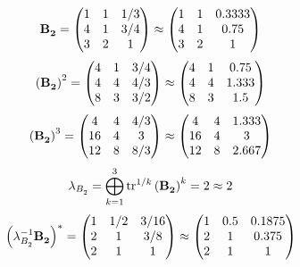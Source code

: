 \documentclass[10pt,a4paper]{article}
\begin{document}
	\[
		\bold{B_2^{}} = 
		\begin{pmatrix}
			{1}{} & {1}{} & {1} / {{3}} \\
			{{4}}{} & {1}{} & {{3}} / {{4}} \\
			{{3}}{} & {{2}}{} & {1}{} \\
		\end{pmatrix}
		\approx
		\begin{pmatrix}
			1        & 1        & 0.3333   \\
			4        & 1        & 0.75     \\
			3        & 2        & 1        \\
		\end{pmatrix}
	\]
	\[
		\left(\bold{B_2^{}}\right)^{2} = 
		\begin{pmatrix}
			{{4}}{} & {1}{} & {{3}} / {{4}} \\
			{{4}}{} & {{4}}{} & {{4}} / {{3}} \\
			{{8}}{} & {{3}}{} & {{3}} / {{2}} \\
		\end{pmatrix}
		\approx
		\begin{pmatrix}
			4        & 1        & 0.75     \\
			4        & 4        & 1.333    \\
			8        & 3        & 1.5      \\
		\end{pmatrix}
	\]
	\[
		\left(\bold{B_2^{}}\right)^{3} = 
		\begin{pmatrix}
			{{4}}{} & {{4}}{} & {{4}} / {{3}} \\
			{{16}}{} & {{4}}{} & {{3}}{} \\
			{{12}}{} & {{8}}{} & {{8}} / {{3}} \\
		\end{pmatrix}
		\approx
		\begin{pmatrix}
			4        & 4        & 1.333    \\
			16       & 4        & 3        \\
			12       & 8        & 2.667    \\
		\end{pmatrix}
	\]
	\[
		\lambda_{B_2^{}} =  \bigoplus ^{3} _{k = 1} \operatorname{tr} ^{1 / k} \left( \bold{B_2^{}} \right)^k = {{2}}{}\approx 2
	\]
	\[
		\left(\lambda_{B_2^{}}^{-1}\bold{B_2^{}}\right)^* = 
		\begin{pmatrix}
			{1}{} & {1} / {{2}} & {{3}} / {{16}} \\
			{{2}}{} & {1}{} & {{3}} / {{8}} \\
			{{2}}{} & {1}{} & {1}{} \\
		\end{pmatrix}
		\approx
		\begin{pmatrix}
			1        & 0.5      & 0.1875   \\
			2        & 1        & 0.375    \\
			2        & 1        & 1        \\
		\end{pmatrix}
	\]
\end{document}

